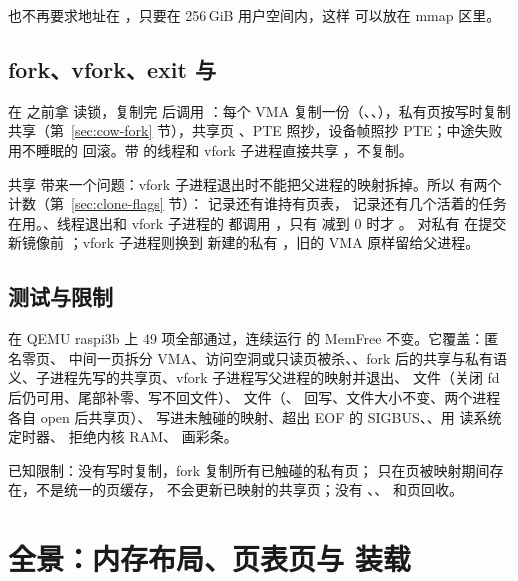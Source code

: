  也不再要求地址在 \code{[0, sz)}，只要在 256\,GiB 用户空间内，这样  可以放在 mmap 区里。

\subsection{fork、vfork、exit 与 }

 在  之前拿  读锁，复制完 \code{[0, sz)} 后调用 ：每个 VMA 复制一份（、、），私有页按写时复制共享（第~\ref{sec:cow-fork} 节），共享页 、PTE 照抄，设备帧照抄 PTE；中途失败用不睡眠的  回滚。带  的线程和 vfork 子进程直接共享 ，不复制。

共享  带来一个问题：vfork 子进程退出时不能把父进程的映射拆掉。所以  有两个计数（第~\ref{sec:clone-flags} 节）： 记录还有谁持有页表， 记录还有几个活着的任务在用。、线程退出和 vfork 子进程的  都调用 ，只有  减到 0 时才 。 对私有  在提交新镜像前 ；vfork 子进程则换到  新建的私有 ，旧的 VMA 原样留给父进程。

\subsection{测试与限制}

 在 QEMU raspi3b 上 49 项全部通过，连续运行  的 MemFree 不变。它覆盖：匿名零页、 中间一页拆分 VMA、访问空洞或只读页被杀、、fork 后的共享与私有语义、子进程先写的共享页、vfork 子进程写父进程的映射并退出、 文件（关闭 fd 后仍可用、尾部补零、写不回文件）、 文件（、 回写、文件大小不变、两个进程各自 open 后共享页）、 写进未触碰的映射、超出 EOF 的 SIGBUS、、用  读系统定时器、 拒绝内核 RAM、 画彩条。

已知限制：没有写时复制，fork 复制所有已触碰的私有页； 只在页被映射期间存在，不是统一的页缓存， 不会更新已映射的共享页；没有 、、 和页回收。

\section{全景：内存布局、页表页与  装载}
\label{sec:mmu-panorama}

